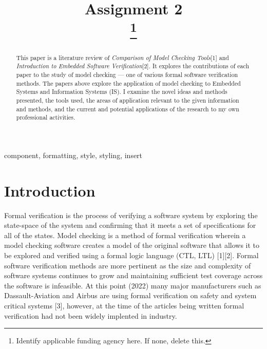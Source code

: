 \documentclass[conference]{IEEEtran}
\begin{document}
\title{Assignment 2\\
\thanks{Identify applicable funding agency here. If none, delete this.}
}

\author{
}

\maketitle

\begin{abstract}
This paper is a literature review of \emph{Comparison of Model Checking Tools}[1] and \emph{Introduction to Embedded Software Verification}[2]. It explores the contributions of each paper to the study of model checking --- one of various formal software verification methods. The papers above explore the application of model checking to Embedded Systems and Information Systems (IS). I examine the novel ideas and methods presented, the tools used, the areas of application relevant to the given information and methods, and the current and potential applications of the research to my own professional activities.
\end{abstract}

\begin{IEEEkeywords}
component, formatting, style, styling, insert
\end{IEEEkeywords}

\section{Introduction}
Formal verification is the process of verifying a software system by exploring the state-space of the system and confirming that it meets a set of specifications for all of the states. Model checking is a method of formal verification wherein a model checking software creates a model of the original software that allows it to be explored and verified using a formal logic language (CTL, LTL) [1][2]. Formal software verification methods are more pertinent as the size and complexity of software systems continues to grow and maintaining sufficient test coverage across the software is infeasible. At this point (2022) many major manufacturers such as Dassault-Aviation and Airbus are using formal verification on safety and system critical systems [3], however, at the time of the articles being written formal verification had not been widely implented in industry.
\end{document}
